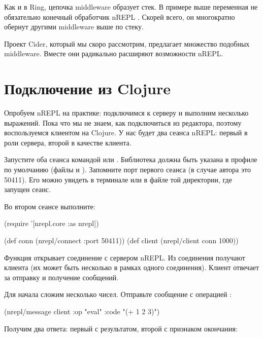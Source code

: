 Как и в Ring, цепочка middleware образует стек. В примере выше переменная  не обязательно конечный обработчик nREPL . Скорей всего, он многократно обернут другими middleware выше по стеку.

Проект Cider, который мы скоро рассмотрим, предлагает множество подобных middleware. Вместе они радикально расширяют возможности nREPL.

\section{Подключение из Clojure}

Опробуем nREPL на практике: подключимся к серверу и выполним несколько выражений. Пока что мы не знаем, как подключиться из редактора, поэтому воспользуемся клиентом на Clojure. У нас будет два сеанса nREPL: первый в роли сервера, второй в качестве клиента.

Запустите оба сеанса командой  или . Библиотека  должна быть указана в профиле по умолчанию (файлы  и ). Запомните порт первого сеанса (в случае автора это 50411). Его можно увидеть в терминале или в файле  той директории, где запущен сеанс.

Во втором сеансе выполните:

\begin{english}
  \begin{clojure}
(require '[nrepl.core :as nrepl])

(def conn (nrepl/connect :port 50411))
(def client (nrepl/client conn 1000))
  \end{clojure}
\end{english}

Функция  открывает соединение с сервером nREPL. Из соединения получают клиента (их может быть несколько в рамках одного соединения). Клиент отвечает за отправку и получение сообщений.

Для начала сложим несколько чисел. Отправьте сообщение с операцией :

\begin{english}
  \begin{clojure}
(nrepl/message client
               {:op "eval" :code "(+ 1 2 3)"})
  \end{clojure}
\end{english}

Получим два ответа: первый с результатом, второй с признаком окончания:

